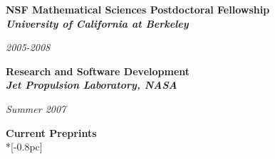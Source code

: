 \documentclass[11pt]{article}
\newcommand{\head}[1]{
  \vspace{10pt}
  {\Large \bf #1} \\*[-0.8pc]
  \underline{\hspace{6.07in}}}
\newcommand{\datedentry}[2]{
  \vspace{5pt}
  \begin{minipage}{5in}{\textbf{#1}}\end{minipage}
  \hfill
  \begin{minipage}{1in}{\hfill\textit{#2}}\end{minipage}
  }
\begin{document}
\vspace{7pt}

\datedentry{NSF Mathematical Sciences Postdoctoral Fellowship\\
{\sl University of California at Berkeley}}{2005-2008}

\vspace{7pt}

\datedentry{Research and Software Development \\
{\sl Jet Propulsion Laboratory, NASA}}{Summer 2007}
%
%
%
%
%
%
%
%
%
%
%
%
%
%
%


\head{Current Preprints}%
\end{document}
